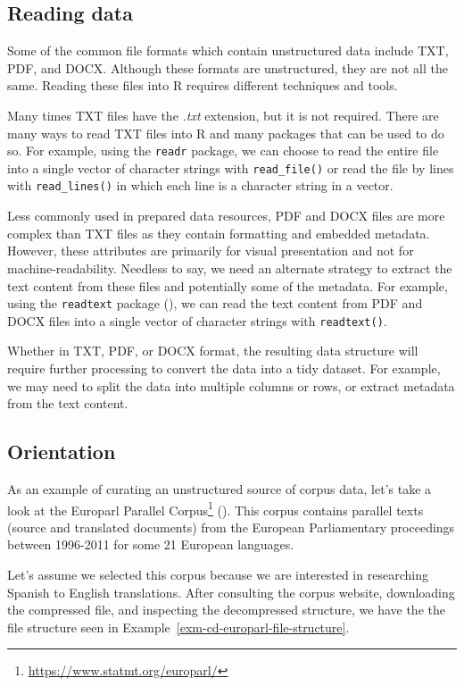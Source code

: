 \documentclass[
  letterpaper,
  DIV=11,
  numbers=noendperiod]{scrreprt}
\theoremstyle{definition}
\theoremstyle{remark}
\DeclareRobustCommand{\href}[2]{#2\footnote{\url{#1}}}
\begin{document}
\subsection{Reading data}\label{reading-data}

Some of the common file formats which contain unstructured data include
TXT, PDF, and DOCX. Although these formats are unstructured, they are
not all the same. Reading these files into R requires different
techniques and tools.

Many times TXT files have the \emph{.txt} extension, but it is not
required. There are many ways to read TXT files into R and many packages
that can be used to do so. For example, using the \texttt{readr}
package, we can choose to read the entire file into a single vector of
character strings with \texttt{read\_file()} or read the file by lines
with \texttt{read\_lines()} in which each line is a character string in
a vector.

Less commonly used in prepared data resources, PDF and DOCX files are
more complex than TXT files as they contain formatting and embedded
metadata. However, these attributes are primarily for visual
presentation and not for machine-readability. Needless to say, we need
an alternate strategy to extract the text content from these files and
potentially some of the metadata. For example, using the
\texttt{readtext} package (), we can read the text content from PDF and DOCX files into a
single vector of character strings with \texttt{readtext()}.

Whether in TXT, PDF, or DOCX format, the resulting data structure will
require further processing to convert the data into a tidy dataset. For
example, we may need to split the data into multiple columns or rows, or
extract metadata from the text content.

\subsection{Orientation}\label{orientation}

As an example of curating an unstructured source of corpus data, let's
take a look at the \href{https://www.statmt.org/europarl/}{Europarl
Parallel Corpus} (). This corpus
contains parallel texts (source and translated documents) from the
European Parliamentary proceedings between 1996-2011 for some 21
European languages.

Let's assume we selected this corpus because we are interested in
researching Spanish to English translations. After consulting the corpus
website, downloading the compressed file, and inspecting the
decompressed structure, we have the the file structure seen in
Example~\ref{exm-cd-europarl-file-structure}.
\end{document}
